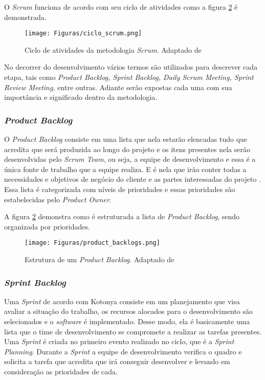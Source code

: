 O \textit{Scrum} funciona de acordo com seu ciclo de atividades como a figura \ref{chave_para_refencia_cruzada} é demonstrada.

\begin{figure}[!hb]
  \centering 
  \texttt{[image: Figuras/ciclo\_scrum.png]}
  \caption{Ciclo de atividades da metodologia \textit{Scrum}. Adaptado de \cite{0000:rafael}}
  \label{chave_para_refencia_cruzada}
\end{figure}

No decorrer do desenvolvimento vários termos são utilizados para descrever cada etapa, tais como \textit{Product Backlog, Sprint Backlog, Daily Scrum Meeting, Sprint Review Meeting,} entre outras. Adiante serão expostas cada uma com sua importância e significado dentro da metodologia.

\subsubsection{\textit{Product Backlog}}
\noindent O \textit{Product Backlog} consiste em uma lista que nela estarão elencadas tudo que acredita que será produzida ao longo do projeto e os itens presentes nela serão desenvolvidas pelo \textit{Scrum Team}, ou seja, a equipe de desenvolvimento e essa é a única fonte de trabalho que a equipe realiza. E é nela que irão conter todas a necessidades e objetivos de negócio do cliente e as partes interessadas do projeto \cite{0000:rafael}. Essa lista é categorizada com níveis de prioridades e essas prioridades são estabelecidas pelo \textit{Product Owner}.

A figura \ref{chave_para_refencia_cruzada} demonstra como é estruturada a lista de \textit{Product Backlog}, sendo organizada por prioridades. 

\begin{figure}[!htb]
  \centering 
  \texttt{[image: Figuras/product\_backlogs.png]}
  \caption{Estrutura de um \textit{Product Backlog}. Adaptado de \cite{0000:rafael}}
  \label{chave_para_refencia_cruzada}
\end{figure}

\subsubsection{\textit{Sprint Backlog}}
\noindent Uma \textit{Sprint} de acordo com Kotonya \cite{1997:Kotonya} consiste em um planejamento que visa avaliar a situação do trabalho, os recursos alocados para o desenvolvimento são selecionados e o \textit{software} é implementado. Desse modo, ela é basicamente uma lista que o time de desenvolvimento se compromete a realizar as tarefas presentes. Uma \textit{Sprint} é criada no primeiro evento realizado no ciclo, que é a \textit{Sprint Planning}. Durante a \textit{Sprint} a equipe de desenvolvimento verifica o quadro e solicita a tarefa que acredita que irá conseguir desenvolver e levando em consideração as prioridades de cada.

